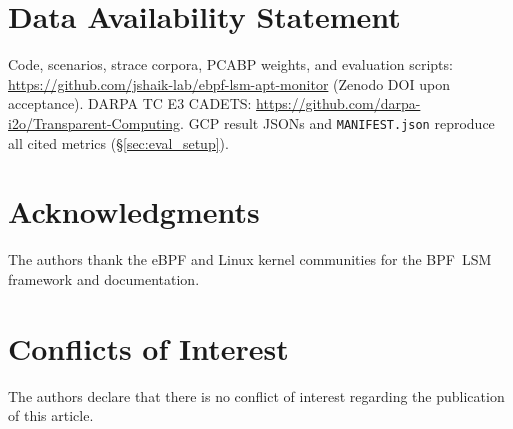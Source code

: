\documentclass[journal]{IEEEtran}
\begin{document}
\section*{Data Availability Statement}
Code, scenarios, strace corpora, PCABP weights, and evaluation scripts:
\url{https://github.com/jshaik-lab/ebpf-lsm-apt-monitor}
(Zenodo DOI upon acceptance).  DARPA TC E3 CADETS:
\url{https://github.com/darpa-i2o/Transparent-Computing}.
GCP result JSONs and \texttt{MANIFEST.json} reproduce all cited metrics
(\S\ref{sec:eval_setup}).

\section*{Acknowledgments}
The authors thank the eBPF and Linux kernel communities for the BPF~LSM
framework and documentation.

\section*{Conflicts of Interest}
The authors declare that there is no conflict of interest regarding the
publication of this article.

\FloatBarrier
\let\oldbibliography\thebibliography
\renewcommand{\thebibliography}[1]{%
  \oldbibliography{#1}%
  \setlength{\itemsep}{0pt plus 0.3pt}%
  \setlength{\parsep}{0pt}%
}

\balance

\end{document}
